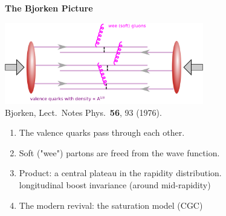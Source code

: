 \documentclass[9pt,a4paper,unknownkeysallowed,xcolor=dvipsnames,aspectratio=43]{beamer}
\begin{document}
\begin{frame}{\bf\huge The Bjorken Picture}	\vspace{4mm}
\begin{center}
\includegraphics[width=0.65\textwidth]{fig/Bjorken}\\
{\tiny  {\color{teablue}
Bjorken,
  Lect.\ Notes Phys.\  {\bf 56}, 93 (1976).
  }}
\end{center}
\begin{enumerate}
\item{\large The valence quarks pass through each other.}
\vspace{2mm}
\item{\large Soft ("wee") partons are freed from the wave function.}
\vspace{2mm}
\item{\large Product: a central plateau in the rapidity distribution.}\\
\vspace{1mm}
    longitudinal boost invariance (around mid-rapidity)
\vspace{1mm}
\item{\large The modern revival: the saturation model (CGC)}

\end{enumerate}
\end{frame}
\end{document}
